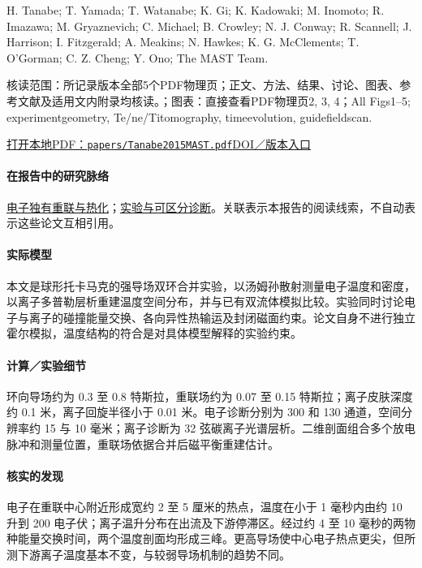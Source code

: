 \documentclass[UTF8,a4paper,11pt,openany,fontset=fandol]{ctexbook}
\begin{document}
H. Tanabe;  T. Yamada;  T. Watanabe;  K. Gi;  K. Kadowaki;  M. Inomoto;  R. Imazawa;  M. Gryaznevich;  C. Michael;  B. Crowley;  N. J. Conway;  R. Scannell;  J. Harrison;  I. Fitzgerald;  A. Meakins;  N. Hawkes;  K. G. McClements;  T. O’Gorman;  C. Z. Cheng;  Y. Ono;  The MAST Team.

\textsf{核读范围：}所记录版本全部5个PDF物理页；正文、方法、结果、讨论、图表、参考文献及适用文内附录均核读。；\textsf{图表：}直接查看PDF物理页2, 3, 4；All Figs1–5;  experimentgeometry, Te/ne/Titomography, timeevolution, guidefieldscan.

\href{run:../papers/Tanabe2015MAST.pdf}{打开本地PDF：\texttt{papers/Tanabe2015MAST.pdf}}\quad\href{https://doi.org/10.1103/PhysRevLett.115.215004}{DOI／版本入口}

\paragraph{在报告中的研究脉络}\hyperref[story:energy]{电子独有重联与热化}；\hyperref[story:diagnostic]{实验与可区分诊断}。关联表示本报告的阅读线索，不自动表示这些论文互相引用。

\paragraph{实际模型}本文是球形托卡马克的强导场双环合并实验，以汤姆孙散射测量电子温度和密度，以离子多普勒层析重建温度空间分布，并与已有双流体模拟比较。实验同时讨论电子与离子的碰撞能量交换、各向异性热输运及封闭磁面约束。论文自身不进行独立霍尔模拟，温度结构的符合是对具体模型解释的实验约束。

\paragraph{计算／实验细节}环向导场约为 0.3 至 0.8 特斯拉，重联场约为 0.07 至 0.15 特斯拉；离子皮肤深度约 0.1 米，离子回旋半径小于 0.01 米。电子诊断分别为 300 和 130 通道，空间分辨率约 15 与 10 毫米；离子诊断为 32 弦碳离子光谱层析。二维剖面组合多个放电脉冲和测量位置，重联场依据合并后磁平衡重建估计。

\paragraph{核实的发现}电子在重联中心附近形成宽约 2 至 5 厘米的热点，温度在小于 1 毫秒内由约 10 升到 200 电子伏；离子温升分布在出流及下游停滞区。经过约 4 至 10 毫秒的两物种能量交换时间，两个温度剖面均形成三峰。更高导场使中心电子热点更尖，但所测下游离子温度基本不变，与较弱导场机制的趋势不同。
\end{document}
